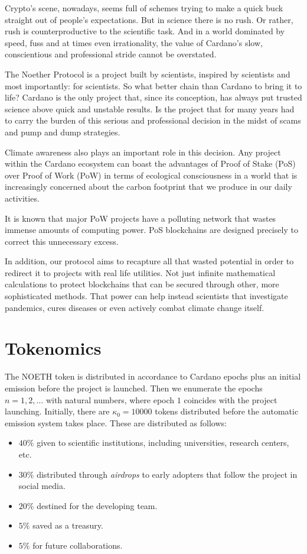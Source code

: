 \documentclass[11pt]{amsart}
\numberwithin{equation}{section}
\theoremstyle{definition}
\theoremstyle{remark}
\renewcommand{\_}[1]{_{\left( #1 \right)}}
\renewcommand{\^}[1]{^{\left( #1 \right)}}
\begin{document}
Crypto's scene, nowadays, seems full of schemes trying to make a quick buck straight out of people's expectations. But in science there is no rush. Or rather, rush is counterproductive to the scientific task. And in a world dominated by speed, fuss and at times even irrationality, the value of Cardano's slow, conscientious and professional stride cannot be overstated.

The Noether Protocol is a project built by scientists, inspired by scientists and most importantly: for scientists. So what better chain than Cardano to bring it to life? Cardano is the only project that, since its conception, has always put trusted science above quick and unstable results. Is the project that for many years had to carry the burden of this serious and professional decision in the midst of scams and pump and dump strategies.


Climate awareness also plays an important role in this decision. Any project within the Cardano ecosystem can boast the advantages of Proof of Stake (PoS) over Proof of Work (PoW) in terms of ecological consciousness in a world that is increasingly concerned about the carbon footprint that we produce in our daily activities.

It is known that major PoW projects have a polluting network that wastes immense amounts of computing power. PoS blockchains are designed precisely to correct this unnecessary excess. 

In addition, our protocol aims to recapture all that wasted potential in order to redirect it to projects with real life utilities. Not just infinite mathematical calculations to protect blockchains that can be secured through other, more sophisticated methods. That power can help instead scientists that investigate pandemics, cures diseases or even actively combat climate change itself.



\section{Tokenomics}

The NOETH token is distributed in accordance to Cardano epochs plus an initial emission before the project is launched. Then we enumerate the epochs $n=1,2,\dots$ with natural numbers, where epoch $1$ coincides with the project launching. Initially, there are $\kappa_0 = 10000$ tokens distributed before the automatic emission system takes place. These are distributed as follows:
\begin{itemize}
	\item $40\%$  given to scientific institutions, including universities, research centers, etc.
	\item $30\%$    distributed through \emph{airdrops} to early adopters that follow the project in social media.
	\item $20\%$   destined for the developing team.
	\item $5\%$    saved as a treasury.
	\item $5\%$   for future collaborations.
\end{itemize}
\end{document}
